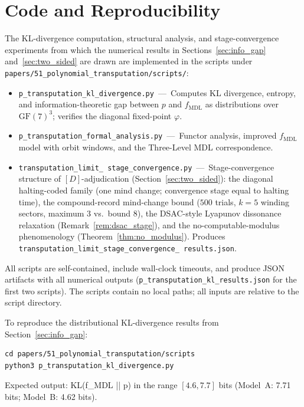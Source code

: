 \documentclass[11pt]{article}
\theoremstyle{remark}
\newcommand{\GF}[1]{\ensuremath{\mathrm{GF}(#1)}}
\newcommand{\fmdl}{\ensuremath{f_{\mathrm{MDL}}}}
\begin{document}
\section{Code and Reproducibility}
\label{app:code}

The KL-divergence computation, structural analysis, and stage-convergence
experiments from which the numerical results in
Sections~\ref{sec:info_gap} and~\ref{sec:two_sided} are drawn are
implemented in the scripts under
\texttt{papers/51\_polynomial\_transputation/scripts/}:

\begin{itemize}
  \item \texttt{p\_transputation\_kl\_divergence.py}~---~Computes KL
    divergence, entropy, and information-theoretic gap between $p$ and
    \fmdl{} as distributions over $\GF{7}^3$; verifies the diagonal
    fixed-point $\varphi$.
  \item \texttt{p\_transputation\_formal\_analysis.py}~---~Functor
    analysis, improved \fmdl{} model with orbit windows, and the
    Three-Level MDL correspondence.
  \item \texttt{transputation\_limit\_\allowbreak
    stage\_convergence.py}~---~Stage-convergence structure of
    $[D]$-adjudication (Section~\ref{sec:two_sided}): the
    diagonal halting-coded family (one mind change; convergence stage
    equal to halting time), the compound-record mind-change bound
    ($500$ trials, $k = 5$ winding sectors, maximum $3$ vs.\ bound $8$),
    the DSAC-style Lyapunov dissonance relaxation
    (Remark~\ref{rem:dsac_stage}), and the no-computable-modulus
    phenomenology (Theorem~\ref{thm:no_modulus}). Produces
    \texttt{transputation\_limit\_\allowbreak stage\_convergence\_\allowbreak
    results.json}.
\end{itemize}

All scripts are self-contained, include wall-clock timeouts, and produce
JSON artifacts with all numerical outputs
(\texttt{p\_transputation\_kl\_results.json} for the first two scripts).
The scripts contain no local paths; all inputs are relative to the script
directory.

To reproduce the distributional KL-divergence results from
Section~\ref{sec:info_gap}:
\begin{verbatim}
cd papers/51_polynomial_transputation/scripts
python3 p_transputation_kl_divergence.py
\end{verbatim}
Expected output: KL(f\_MDL || p) in the range $[4.6, 7.7]$ bits
(Model~A: 7.71 bits; Model~B: 4.62 bits).
\end{document}

